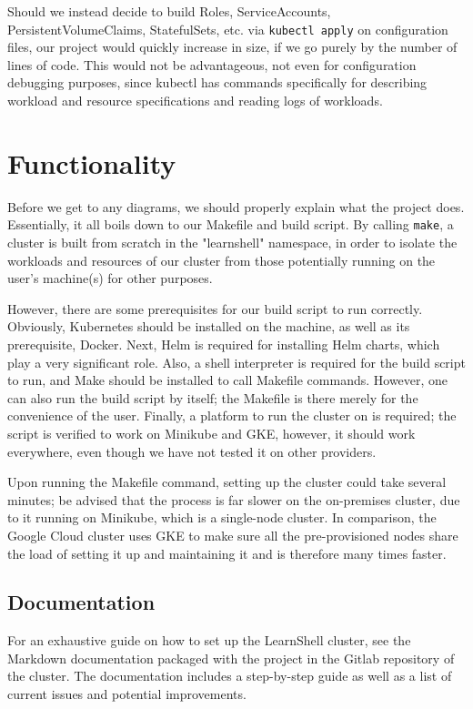 \documentclass[thesis=B,english]{FITthesis}[2019/12/23]
\begin{document}
Should we instead decide to build Roles, ServiceAccounts, PersistentVolumeClaims, StatefulSets, etc. via \verb|kubectl apply| on configuration files, our project would quickly increase in size, if we go purely by the number of lines of code. This would not be advantageous, not even for configuration debugging purposes, since kubectl has commands specifically for describing workload and resource specifications and reading logs of workloads.

\section{Functionality}

Before we get to any diagrams, we should properly explain what the project does. Essentially, it all boils down to our Makefile and build script. By calling \verb|make|, a cluster is built from scratch in the "learnshell" namespace, in order to isolate the workloads and resources of our cluster from those potentially running on the user's machine(s) for other purposes. 

However, there are some prerequisites for our build script to run correctly. Obviously, Kubernetes should be installed on the machine, as well as its prerequisite, Docker. Next, Helm is required for installing Helm charts, which play a very significant role. Also, a shell interpreter is required for the build script to run, and Make should be installed to call Makefile commands. However, one can also run the build script by itself; the Makefile is there merely for the convenience of the user. Finally, a platform to run the cluster on is required; the script is verified to work on Minikube and GKE, however, it should work everywhere, even though we have not tested it on other providers.

Upon running the Makefile command, setting up the cluster could take several minutes; be advised that the process is far slower on the on-premises cluster, due to it running on Minikube, which is a single-node cluster. In comparison, the Google Cloud cluster uses GKE to make sure all the pre-provisioned nodes share the load of setting it up and maintaining it and is therefore many times faster.

\subsection{Documentation}

For an exhaustive guide on how to set up the LearnShell cluster, see the Markdown documentation packaged with the project in the Gitlab repository of the cluster. The documentation includes a step-by-step guide as well as a list of current issues and potential improvements.
\end{document}
